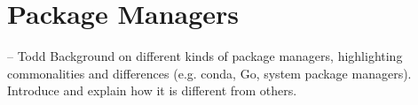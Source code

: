 \section{Package Managers}
\label{sec:pack-managers}
-- Todd
Background on different kinds of package managers, highlighting commonalities and differences (e.g. conda, Go, system package managers). Introduce \spack and explain how it is different from others.
